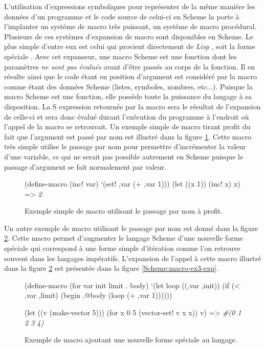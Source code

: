 \documentclass[12pt,oneside,letterpaper,francais]{book}
\newcommand{\lisp}{{\textit{Lisp }}}
\newcommand{\scheme}[1]{\selectlanguage{english}{\tt #1}\selectlanguage{french}}
\newcommand{\schemeresult}[1]{{\it #1}}
\begin{document}
L'utilisation d'expressions symboliques pour représenter de la même
manière les données d'un programme et le code source de celui-ci en
Scheme la porte à l'implanter un système de macro très puissant, un
système de macro procédural. Plusieurs de ces systèmes d'expansion de
macro sont disponibles en Scheme. Le plus simple d'entre eux est celui
qui provient directement de \lisp, soit la forme spéciale
\scheme{define-macro}. Avec cet expanseur, une macro Scheme est une
fonction dont les paramètres \emph{ne sont pas évalués} avant d'être
passés au corps de la fonction. Il en résulte ainsi que le code étant
en position d'argument est considéré par la macro comme étant des
données Scheme (listes, symboles, nombres, etc...). Puisque la macro
Scheme est une fonction, elle possède toute la puissance du langage à
sa disposition. La S expression retournée par la macro sera le
résultat de l'expansion de celle-ci et sera donc évalué durant
l'exécution du programme à l'endroit où l'appel de la macro se
retrouvait. Un exemple simple de macro tirant profit du fait que
l'argument est passé par nom est illustré dans la figure
\ref{Scheme:macro-ex2}. Cette macro très simple utilise le passage par
nom pour permettre d'incrémenter la valeur d'une variable, ce qui ne
serait pas possible autrement en Scheme puisque le passage d'argument
se fait normalement par valeur.

\begin{figure}[htb!]
  \begin{schemecode}
(define-macro (inc! var) `(set! ,var (+ ,var 1)))
(let ((x 1))
    (inc! x)
    x) => \schemeresult{2}
  \end{schemecode}
  \caption{Exemple simple de macro utilisant le passage par nom à profit.}
  \label{Scheme:macro-ex2}
\end{figure}


Un autre exemple de macro utilisant le passage par nom est donné dans
la figure \ref{Scheme:macro-ex3}. Cette macro permet d'augmenter le
langage Scheme d'une nouvelle forme spéciale qui correspond à une
forme simple d'itération comme l'on retrouve souvent dans les langages
impératifs. L'expansion de l'appel à cette macro illustré dans la
figure \ref{Scheme:macro-ex3} est présentée dans la figure
\ref{Scheme:macro-ex3-exp}.

\begin{figure}[htb!]
  \begin{schemecode}
(define-macro (for var init limit . body)
  `(let loop ((,var ,init))
     (if (< ,var ,limit)
         (begin ,@body
                (loop (+ ,var 1))))))

(let ((v (make-vector 5)))
  (for x 0 5 (vector-set! v x x))
  v) => \schemeresult{\#(0 1 2 3 4)}
  \end{schemecode}
  \caption{Exemple de macro ajoutant une nouvelle forme spéciale au langage.}
  \label{Scheme:macro-ex3}
\end{figure}
\end{document}
